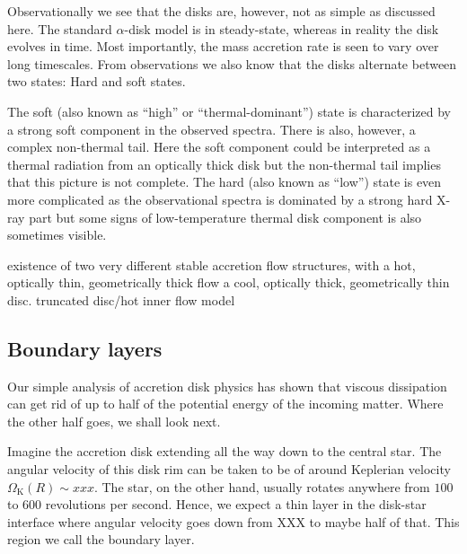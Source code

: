 Observationally we see that the disks are, however, not as simple as discussed here.\cite[see][for a review]{DGK07}
The standard $\alpha$-disk model is in steady-state, whereas in reality the disk evolves in time.
Most importantly, the mass accretion rate is seen to vary over long timescales.
From observations we also know that the disks alternate between two states:
Hard and soft states.\cite{HvdK89, MDF14, DGK07}

The soft (also known as ``high'' or ``thermal-dominant'') state is characterized by a strong soft component in the observed spectra.\cite{GZP99}
There is also, however, a complex non-thermal tail.\cite{MRC00}
Here the soft component could be interpreted as a thermal radiation from an optically thick disk but the non-thermal tail implies that this picture is not complete.
The hard (also known as ``low'') state is even more complicated as the observational spectra is dominated by a strong hard X-ray part but some signs of low-temperature thermal disk component is also sometimes visible.\cite[see, e.g.,][]{ZG04}

existence of two very different stable accretion flow structures, with a hot,
optically thin, geometrically thick flow 
a cool, optically thick, geometrically thin disc. 
truncated disc/hot inner flow model



\subsection{Boundary layers}

Our simple analysis of accretion disk physics has shown that viscous dissipation can get rid of up to half of the potential energy of the incoming matter.
Where the other half goes, we shall look next.

Imagine the accretion disk extending all the way down to the central star.
The angular velocity of this disk rim can be taken to be of around Keplerian velocity $\Omega_{\mathrm{K}}(R) \sim xxx$.
The star, on the other hand, usually rotates anywhere from $100$ to $600$ revolutions per second.
Hence, we expect a thin layer in the disk-star interface where angular velocity goes down from XXX to maybe half of that.
This region we call the boundary layer.

